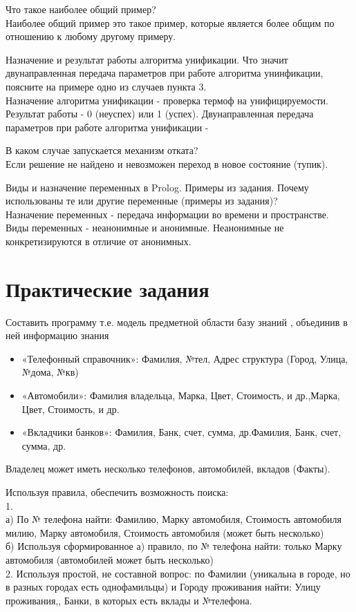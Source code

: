 Что такое наиболее общий пример?\\
Наиболее общий пример это такое пример, которые является более общим по отношению к любому другому примеру.

Назначение и результат работы алгоритма унификации. Что значит двунаправленная передача параметров при работе алгоритма унинфикации, поясните на примере одно из случаев пункта 3.\\
Назначение алгоритма унификации - проверка термоф на унифицируемости. Результат работы - 0 (неуспех) или 1 (успех). Двунаправленная передача параметров при работе алгоритма унификации - 

В каком случае запускается механизм отката?\\
Если решение не найдено и невозможен переход в новое состояние (тупик).

Виды и назначение переменных в Prolog. Примеры из задания. Почему использованы те или другие переменные (примеры из задания)?\\
Назначение переменных - передача информации во времени и пространстве. Виды переменных - неанонимные и анонимные. Неанонимные не конкретизируются в отличие от анонимных.

\chapter{Практические задания}
Составить программу т.е. модель предметной области базу знаний , объединив в ней информацию знания
\begin{itemize}
\item «Телефонный справочник»: Фамилия, №тел, Адрес структура (Город, Улица, №дома, №кв)
\item «Автомобили»: Фамилия владельца, Марка, Цвет, Стоимость, и др.,Марка, Цвет, Стоимость, и др.
\item «Вкладчики банков»: Фамилия, Банк, счет, сумма, др.Фамилия, Банк, счет, сумма, др.
\end{itemize}
Владелец может иметь несколько телефонов, автомобилей, вкладов (Факты).

Используя правила, обеспечить возможность поиска:\\
1.\\
а) По № телефона найти: Фамилию, Марку автомобиля, Стоимость автомобиля милию, Марку автомобиля, Стоимость автомобиля (может быть несколько)\\
б) Используя сформированное а) правило, по № телефона найти: только Марку автомобиля (автомобилей может быть несколько)\\
2. Используя простой, не составной вопрос: по Фамилии (уникальна в городе, но в разных городах есть однофамильцы) и Городу проживания найти: Улицу проживания,, Банки, в которых есть вклады и №телефона.\\

